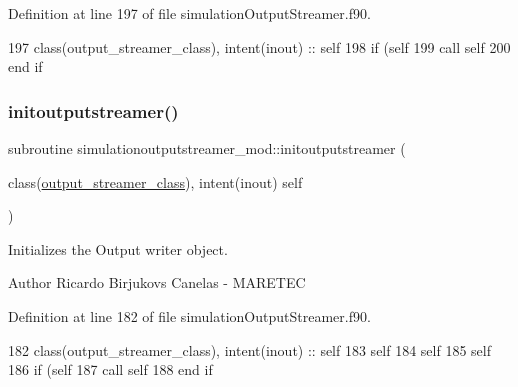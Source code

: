 Definition at line 197 of file simulation\+Output\+Streamer.\+f90.


\begin{DoxyCode}
197     \textcolor{keywordtype}{class}(output\_streamer\_class), \textcolor{keywordtype}{intent(inout)} :: self
198     \textcolor{keywordflow}{if} (self%
199         \textcolor{keyword}{call }self%
200 \textcolor{keywordflow}{    end if}
\end{DoxyCode}
\mbox{\label{namespacesimulationoutputstreamer__mod_a9ab3e2101fbed18ea896729f7201e1aa}} 
\subsubsection{\texorpdfstring{initoutputstreamer()}{initoutputstreamer()}}
{\footnotesize\ttfamily subroutine simulationoutputstreamer\+\_\+mod\+::initoutputstreamer (\begin{DoxyParamCaption}\item[{class(\mbox{\hyperlink{structsimulationoutputstreamer__mod_1_1output__streamer__class}{output\+\_\+streamer\+\_\+class}}), intent(inout)}]{self }\end{DoxyParamCaption})\hspace{0.3cm}{\ttfamily [private]}}



Initializes the Output writer object. 

\begin{DoxyAuthor}{Author}
Ricardo Birjukovs Canelas -\/ M\+A\+R\+E\+T\+EC 
\end{DoxyAuthor}


Definition at line 182 of file simulation\+Output\+Streamer.\+f90.


\begin{DoxyCode}
182     \textcolor{keywordtype}{class}(output\_streamer\_class), \textcolor{keywordtype}{intent(inout)} :: self
183     self%
184     self%
185     self%
186     \textcolor{keywordflow}{if} (self%
187         \textcolor{keyword}{call }self%
188 \textcolor{keywordflow}{    end if}
\end{DoxyCode}
\mbox{\label{namespacesimulationoutputstreamer__mod_a2c660b4331c576befebcf037b82b8d7a}} 

